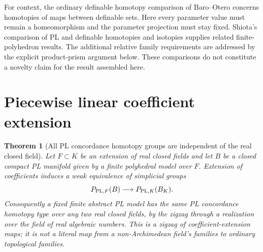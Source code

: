 \documentclass[11pt,a4paper]{article}
\newtheorem{theorem}{Theorem}[section]
\theoremstyle{definition}
\begin{document}
For context, the ordinary definable homotopy comparison of Baro--Otero
\cite[Theorem~3.1 and Corollary~3.3, pp.~5--7]{BaroOtero2008v1}
concerns homotopies of maps between definable sets.  Here every parameter
value must remain a homeomorphism and the parameter projection must stay
fixed.  Shiota's comparison of PL and definable homotopies and isotopies
\cite[Lemma~3.3, p.~37, and relative isotopy argument, pp.~44--46]{Shiota2010}
supplies related finite-polyhedron results.  The additional relative
family requirements are addressed by the explicit product-prism argument
below.  These comparisons do not constitute a novelty claim for the
result assembled here.




\section{Piecewise linear coefficient extension}
\begin{theorem}[All PL concordance homotopy groups are independent of the real closed field]\label{result-40}
Let $F\subset K$ be an extension of real closed fields and let $B$
be a closed compact PL manifold given by a finite polyhedral model
over $F$. Extension of coefficients induces a weak equivalence
of simplicial groups
\[
 P_{{\rm PL},F}(B)\longrightarrow P_{{\rm PL},K}(B_K).
\]
Consequently a fixed finite abstract PL model has the same PL
concordance homotopy type over any two real closed fields, by the
zigzag through a realization over the field of real algebraic
numbers. This is a zigzag of coefficient-extension maps; it is
not a literal map from a non-Archimedean field's families to
ordinary topological families.
\end{theorem}
\end{document}
